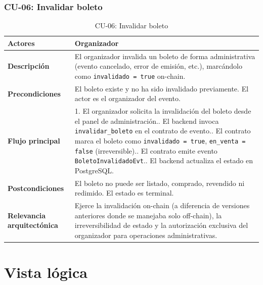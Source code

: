 \documentclass[12pt,oneside]{article}
\begin{document}
\clearpage
\subsubsection{CU-06: Invalidar boleto}

\begin{table}[h!]
  \centering
  \begin{tabularx}{\textwidth}{@{}p{3.5cm} X@{}}
    \toprule
    \textbf{Actores} & Organizador\\
    \midrule
    \textbf{Descripción} & El organizador invalida un boleto de forma administrativa (evento cancelado, error de emisión, etc.), marcándolo como \texttt{invalidado = true} on-chain.\\
    \midrule
    \textbf{Precondiciones} & El boleto existe y no ha sido invalidado previamente. El actor es el organizador del evento.\\
    \midrule
    \textbf{Flujo principal} &
      1. El organizador solicita la invalidación del boleto desde el panel de administración.\newline
      2. El backend invoca \texttt{invalidar\_boleto} en el contrato de evento.\newline
      3. El contrato marca el boleto como \texttt{invalidado = true}, \texttt{en\_venta = false} (irreversible).\newline
      4. El contrato emite evento \texttt{BoletoInvalidadoEvt}.\newline
      5. El backend actualiza el estado en PostgreSQL.\\
    \midrule
    \textbf{Postcondiciones} & El boleto no puede ser listado, comprado, revendido ni redimido. El estado es terminal.\\
    \midrule
    \textbf{Relevancia arquitectónica} & Ejerce la invalidación on-chain (a diferencia de versiones anteriores donde se manejaba solo off-chain), la irreversibilidad de estado y la autorización exclusiva del organizador para operaciones administrativas.\\
    \bottomrule
  \end{tabularx}
  \caption{CU-06: Invalidar boleto}
  \label{tab:cu06}
\end{table}

\FloatBarrier
\clearpage
\section{Vista lógica}
\label{sec:vista-logica}
\end{document}
